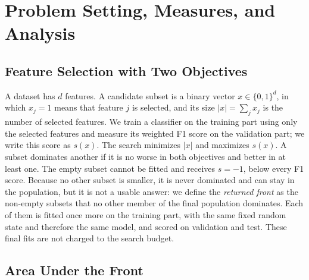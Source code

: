 
\section{Problem Setting, Measures, and Analysis}
\label{sec:metrics}

\subsection{Feature Selection with Two Objectives}
\label{sec:problem}

A dataset has $d$ features. A candidate subset is a binary vector $x \in \{0,1\}^d$, in which $x_j = 1$ means that feature $j$ is selected, and its size $|x| = \sum_j x_j$ is the number of selected features. We train a classifier on the training part using only the selected features and measure its weighted F1 score on the validation part; we write this score as $s(x)$. The search minimizes $|x|$ and maximizes $s(x)$. A subset dominates another if it is no worse in both objectives and better in at least one. The empty subset cannot be fitted and receives $s = -1$, below every F1 score. Because no other subset is smaller, it is never dominated and can stay in the population, but it is not a usable answer: we define the \emph{returned front} as the non-empty subsets that no other member of the final population dominates. Each of them is fitted once more on the training part, with the same fixed random state and therefore the same model, and scored on validation and test. These final fits are not charged to the search budget.

\subsection{Area Under the Front}
\label{sec:auf}


